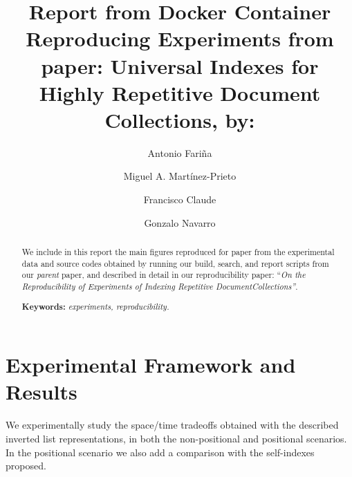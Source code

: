 \documentclass[review]{elsarticle}
\begin{document}
 
\begin{frontmatter}	
	\title{Report from Docker Container\\ Reproducing Experiments from paper: Universal Indexes for Highly Repetitive Document Collections, by:}
	\tnotetext[t1]{}


	\author[udc]{Antonio Fari\~na}

	\author[uva]{Miguel A. Mart\'inez-Prieto}

	\author[udp]{Francisco Claude}

	\author[uchile]{Gonzalo Navarro}
	


	\address[udp]{Escuela de Inform\'atica y Telecomunicaciones, Universidad Diego Portales, Chile.\\}
	\address[udc]{Database Laboratory, University of A Coru\~na, Spain.\\}
	\address[uva]{DataWeb Research, Department of Computer Science, University of Valladolid, Spain.}		
	\address[uchile]{Department of Computer Science, University of Chile, Chile.}


	\begin{abstract}
We include in this report the main figures reproduced for paper \cite{CFMNis16.3} from the experimental data and source codes obtained by
running our build, search, and report scripts from our {\em parent} paper, and described in detail in our reproducibility paper: {``\em On the Reproducibility of Experiments of Indexing Repetitive DocumentCollections''}.
\bigskip
\noindent

{\bf Keywords:} {\em experiments, reproducibility.}
	\end{abstract}

\end{frontmatter}



\section{Experimental Framework and Results} 

We experimentally study the space/time tradeoffs obtained with the described 
inverted list representations, in both the non-positional and positional 
scenarios. In the positional scenario we also add a comparison with the 
self-indexes proposed.
\end{document}
